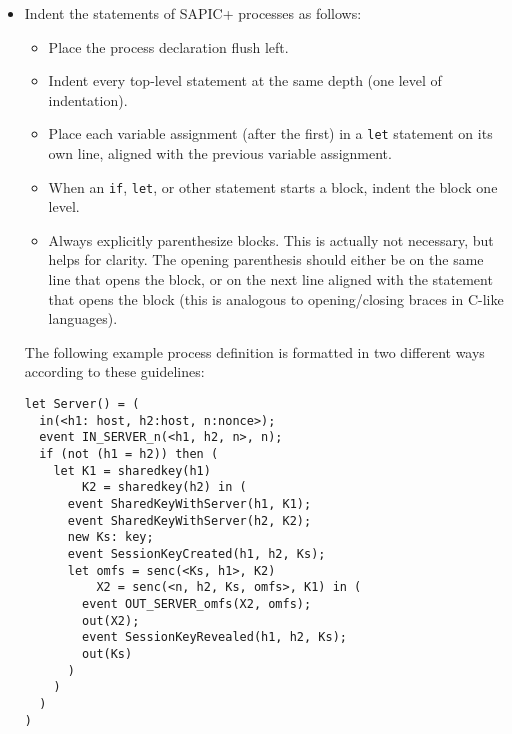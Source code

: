 \begin{itemize}
\item Indent the statements of SAPIC+ processes as follows:

\begin{itemize}

    \item Place the process declaration flush left.

    \item Indent every top-level statement at the same depth (one level of indentation).

    \item Place each variable assignment (after the first) in a \texttt{let} statement on its own line, aligned with the previous variable assignment.

    \item When an \texttt{if}, \texttt{let}, or other statement starts a block, indent the block one level.

    \item Always explicitly parenthesize blocks. This is actually not necessary, but helps for clarity. The opening parenthesis should either be on the same line that opens the block, or on the next line aligned with the statement that opens the block (this is analogous to opening/closing braces in C-like languages).

\end{itemize}

The following example process definition is formatted in two different ways according to these guidelines:

\begin{center}
\begin{minipage}{0.7\linewidth}
\begin{lstlisting}
let Server() = (
  in(<h1: host, h2:host, n:nonce>);
  event IN_SERVER_n(<h1, h2, n>, n);
  if (not (h1 = h2)) then (
    let K1 = sharedkey(h1)
        K2 = sharedkey(h2) in (
      event SharedKeyWithServer(h1, K1);
      event SharedKeyWithServer(h2, K2);
      new Ks: key;
      event SessionKeyCreated(h1, h2, Ks);
      let omfs = senc(<Ks, h1>, K2)
          X2 = senc(<n, h2, Ks, omfs>, K1) in (
        event OUT_SERVER_omfs(X2, omfs);
        out(X2);
        event SessionKeyRevealed(h1, h2, Ks);
        out(Ks)
      )
    )
  )
)
\end{lstlisting}\end{minipage}
\end{center}


\end{itemize}
